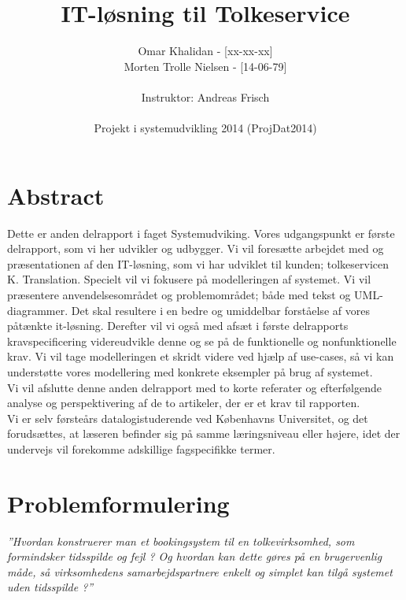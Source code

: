 \documentclass[12pt]{article}   %
\title{IT-løsning til Tolkeservice}
\author{Omar Khalidan - [xx-xx-xx]\\
     Morten Trolle Nielsen - [14-06-79]\\ \\
    Instruktor: Andreas Frisch\\ \\
Projekt i systemudvikling 2014 (ProjDat2014)}
\begin{document}
\maketitle
\thispagestyle{empty}
\newpage
\tableofcontents
\newpage

\section{Abstract}
Dette er anden delrapport i faget Systemudviking. Vores udgangspunkt er første
delrapport, som vi her udvikler og udbygger. Vi vil foresætte arbejdet med og
præsentationen af den IT-løsning, som vi har udviklet til kunden; tolkeservicen
K. Translation. Specielt vil vi fokusere på modelleringen af systemet. Vi vil 
præsentere anvendelsesområdet og problemområdet; både med tekst og UML-diagrammer.
Det skal resultere i en bedre og umiddelbar forståelse af vores påtænkte it-løsning.
Derefter vil vi også med afsæt i første delrapports kravspecificering videreudvikle
denne og se på de funktionelle og nonfunktionelle krav. Vi vil tage modelleringen
et skridt videre ved hjælp af use-cases, så vi kan understøtte vores modellering med
konkrete eksempler på brug af systemet. \\
Vi vil afslutte denne anden delrapport med to korte referater og efterfølgende
analyse og perspektivering af de to artikeler, der er et krav til rapporten.\\
Vi er selv førsteårs datalogistuderende ved Københavns Universitet, og det
forudsættes, at læseren befinder sig på samme læringsniveau eller højere, idet
der undervejs vil forekomme adskillige fagspecifikke termer. 

\newpage

\section{Problemformulering}

\emph{”Hvordan konstruerer man et bookingsystem til en tolkevirksomhed, som
formindsker tidsspilde og fejl ? Og hvordan kan dette gøres på en brugervenlig
måde, så virksomhedens samarbejdspartnere enkelt og simplet kan tilgå systemet 
uden tidsspilde ?”}\\
\end{document}
